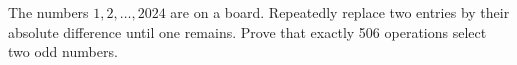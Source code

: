The numbers $1,2,\ldots,2024$ are on a board. Repeatedly replace two entries by their absolute difference until one remains. Prove that exactly 506 operations select two odd numbers.
